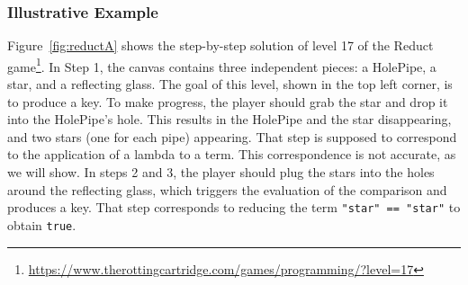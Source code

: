 \subsubsection{Illustrative Example}
Figure~\ref{fig:reductA} shows the step-by-step solution of level 17 of the Reduct game\footnote{\url{https://www.therottingcartridge.com/games/programming/?level=17}}.
In Step 1, the canvas contains three independent pieces:
a HolePipe, a star, and a reflecting glass.
The goal of this level, shown in the top left corner, is to produce a key.
%
To make progress, the player should grab the star and drop it into the HolePipe's hole.
This results in the HolePipe and the star disappearing, and two stars (one for each pipe) appearing.
That step is supposed to correspond to the application of a lambda to a term.
This correspondence is not accurate, as we will show.
In steps 2 and 3, the player should plug the stars into the holes around the reflecting glass,
which triggers the evaluation of the comparison and produces a key.
That step corresponds to reducing the term \verb|"star" == "star"| to obtain \verb|true|.
%
%
%
%

